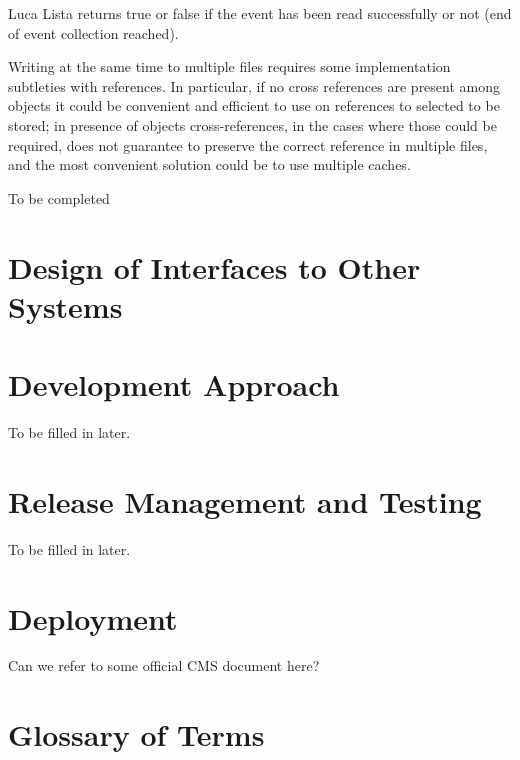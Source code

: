\documentclass[draftmode]{memarticle}
\newcommand{\Pool}{\productname{Pool}}
\newcommand{\EDProduct}{\classname{ED\-Product}}
\begin{document}
\begin{signednote}{Luca Lista}
 returns true or false if the
event has been read successfully or not (end of event collection reached).

Writing at the same time to multiple files requires some implementation subtleties
with \Pool references. In particular, if no cross references are present among
objects it could be convenient and efficient to use  on
references to \EDProduct selected to be stored; in presence of objects cross-references,
in the cases where those could be required,  does not guarantee to 
preserve the correct reference in multiple files, and the most convenient solution could be 
to use multiple caches.


\end{signednote}

\begin{fixme}
To be completed
\end{fixme}

\chapter{Design of Interfaces to Other Systems}

\chapter{Development Approach}

\begin{fixme}
To be filled in later.
\end{fixme}

\chapter{Release Management and Testing}

\begin{fixme}
To be filled in later.
\end{fixme}

\chapter{Deployment}

\begin{fixme}
Can we refer to some official CMS document here?
\end{fixme}

\appendix

\chapter{Glossary of Terms}\label{sec:glossary}
\end{document}
